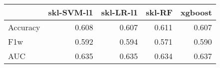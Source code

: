 \begin{tabular}{lrrrr}
\toprule
{} &  skl-SVM-l1 &  skl-LR-l1 &  skl-RF &  xgboost \\
\midrule
Accuracy &       0.608 &      0.607 &   0.611 &    0.607 \\
F1w      &       0.592 &      0.594 &   0.571 &    0.590 \\
AUC      &       0.635 &      0.635 &   0.634 &    0.637 \\
\bottomrule
\end{tabular}
